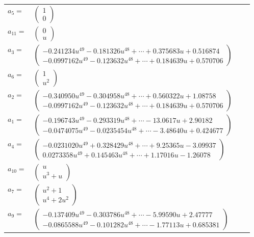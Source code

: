 \documentclass[1p]{elsarticle_modified}
\theoremstyle{definition}
\begin{document}
\begin{tabular}{m{7pt} m{180pt} m{7pt} m{180pt} }
\flushright $a_{5}=$&$\begin{pmatrix}1\\0\end{pmatrix}$ \\
\flushright $a_{11}=$&$\begin{pmatrix}0\\u\end{pmatrix}$ \\
\flushright $a_{3}=$&$\begin{pmatrix}-0.241234 u^{49}-0.181326 u^{48}+\cdots+0.375683 u+0.516874\\-0.0997162 u^{49}-0.123632 u^{48}+\cdots+0.184639 u+0.570706\end{pmatrix}$ \\
\flushright $a_{6}=$&$\begin{pmatrix}1\\u^2\end{pmatrix}$ \\
\flushright $a_{2}=$&$\begin{pmatrix}-0.340950 u^{49}-0.304958 u^{48}+\cdots+0.560322 u+1.08758\\-0.0997162 u^{49}-0.123632 u^{48}+\cdots+0.184639 u+0.570706\end{pmatrix}$ \\
\flushright $a_{1}=$&$\begin{pmatrix}-0.196743 u^{49}-0.293319 u^{48}+\cdots-13.0617 u+2.90182\\-0.0474075 u^{49}-0.0235454 u^{48}+\cdots-3.48640 u+0.424677\end{pmatrix}$ \\
\flushright $a_{4}=$&$\begin{pmatrix}-0.0231020 u^{49}+0.328429 u^{48}+\cdots+9.25365 u-3.09937\\0.0273358 u^{49}+0.145463 u^{48}+\cdots+1.17016 u-1.26078\end{pmatrix}$ \\
\flushright $a_{10}=$&$\begin{pmatrix}u\\u^3+u\end{pmatrix}$ \\
\flushright $a_{7}=$&$\begin{pmatrix}u^2+1\\u^4+2 u^2\end{pmatrix}$ \\
\flushright $a_{9}=$&$\begin{pmatrix}-0.137409 u^{49}-0.303786 u^{48}+\cdots-5.99590 u+2.47777\\-0.0865588 u^{49}-0.101282 u^{48}+\cdots-1.77113 u+0.685381\end{pmatrix}$ \\

\end{tabular}
\end{document}
